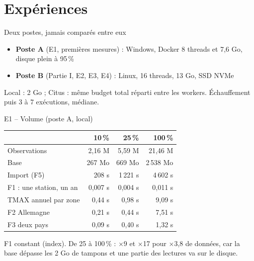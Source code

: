 \documentclass[aspectratio=169]{pres}
\begin{document}
\section{Expériences}

\begin{frame}{Deux postes, jamais comparés entre eux}
  \begin{itemize}
    \item \textbf{Poste A} (E1, premières mesures) : Windows, Docker 8 threads et 7,6 Go, disque plein à 95\,\%
    \item \textbf{Poste B} (Partie I, E2, E3, E4) : Linux, 16 threads, 13 Go, SSD NVMe
  \end{itemize}
  \vspace{0.5em}
  \small Local :  2 Go ; Citus : même budget total réparti entre les workers.
  Échauffement puis 3 à 7 exécutions, médiane.
\end{frame}

\begin{frame}{E1 -- Volume (poste A, local)}
  \small
  \begin{table}
    \centering
    \begin{tabular}{|l|r|r|r|}
      \hline
       & \textbf{10\,\%} & \textbf{25\,\%} & \textbf{100\,\%} \\ \hline
      Observations & 2,16 M & 5,59 M & 21,46 M \\
      Base & 267 Mo & 669 Mo & 2\,538 Mo \\
      Import (F5) & 208 s & 1\,221 s & 4\,602 s \\ \hline
      F1 : une station, un an & 0,007 s & 0,004 s & 0,011 s \\
      TMAX annuel par zone & 0,44 s & 0,98 s & 9,09 s \\
      F2 Allemagne & 0,21 s & 0,44 s & 7,51 s \\
      F3 deux pays & 0,09 s & 0,40 s & 1,32 s \\ \hline
    \end{tabular}
  \end{table}
  F1 constant (index). De 25 à 100\,\% : $\times$9 et $\times$17 pour $\times$3,8 de données, car la base dépasse les 2 Go de tampons et une partie des lectures va sur le disque.
\end{frame}
\end{document}
